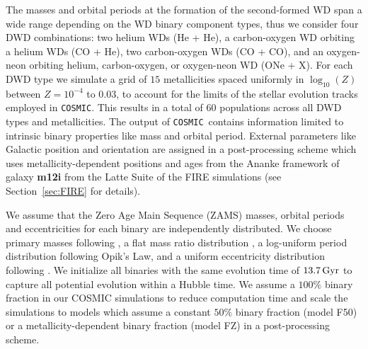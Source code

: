 \documentclass[twocolumn]{aastex631}
\newcommand{\cosmic}{\texttt{COSMIC}}
\begin{document}


The masses and orbital periods at the formation of the second-formed WD span a wide range depending on the WD binary component types, thus we consider four DWD combinations: two helium WDs (He + He), a carbon-oxygen WD orbiting a helium WDs (CO + He), two carbon-oxygen WDs (CO + CO), and an oxygen-neon orbiting helium, carbon-oxygen, or oxygen-neon WD (ONe + X). For each DWD type we simulate a grid of $15$ metallicities spaced uniformly in $\log_{10}(Z)$ between $Z=10^{-4}$ to $0.03$, to account for the limits of the \citet{Hurley2000} stellar evolution tracks employed in \cosmic. This results in a total of $60$ populations across all DWD types and metallicities. The output of \cosmic\ contains information limited to intrinsic binary properties like mass and orbital period. External parameters like Galactic position and orientation are assigned in a post-processing scheme which uses metallicity-dependent positions and ages from the Ananke framework of galaxy \textbf{m12i} from the Latte Suite of the FIRE simulations (see Section~\ref{sec:FIRE} for details).


We assume that the Zero Age Main Sequence (ZAMS) masses, orbital periods and eccentricities for each binary are independently distributed. We choose primary masses following \citet{Kroupa2001}, a flat mass ratio distribution \citep{Mazeh1992, Goldberg1994}, a log-uniform period distribution following Opik's Law, and a uniform eccentricity distribution following \cite{Geller2019}. We initialize all binaries with the same evolution time of $13.7\,\rm{Gyr}$ to capture all potential evolution within a Hubble time. We assume a $100\%$ binary fraction in our COSMIC simulations to reduce computation time and scale the simulations to models which assume a constant $50\%$ binary fraction (model F50) or a metallicity-dependent binary fraction (model FZ) in a post-processing scheme. 
\end{document}
